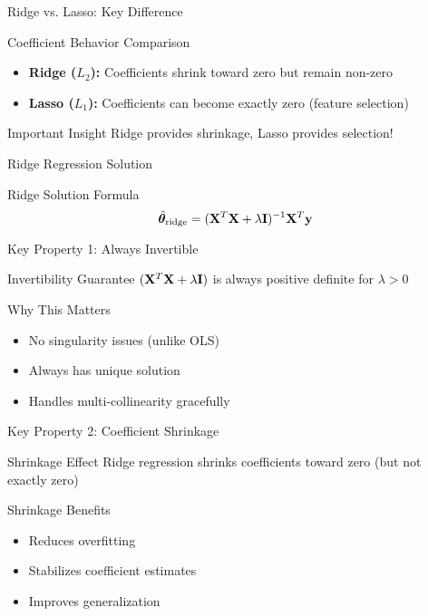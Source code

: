 \documentclass{beamer}
\begin{document}
\begin{frame}{Ridge vs. Lasso: Key Difference}
\begin{keypointsbox}{Coefficient Behavior Comparison}
\begin{itemize}
\item \textbf{Ridge ($L_2$):} Coefficients shrink toward zero but remain non-zero
\item \textbf{Lasso ($L_1$):} Coefficients can become exactly zero (feature selection)
\end{itemize}
\end{keypointsbox}
\pause

\begin{alertbox}{Important Insight}
Ridge provides shrinkage, Lasso provides selection!
\end{alertbox}
\end{frame}

\begin{frame}{Ridge Regression Solution}
\begin{theorembox}{Ridge Solution Formula}
$$\hat{\boldsymbol{\theta}}_{\text{ridge}} = (\mathbf{X}^T\mathbf{X} + \lambda\mathbf{I})^{-1}\mathbf{X}^T\mathbf{y}$$
\end{theorembox}
\end{frame}

\begin{frame}{Key Property 1: Always Invertible}
\begin{theorembox}{Invertibility Guarantee}
$(\mathbf{X}^T\mathbf{X} + \lambda\mathbf{I})$ is always positive definite for $\lambda > 0$
\end{theorembox}
\pause

\begin{keypointsbox}{Why This Matters}
\begin{itemize}
\item No singularity issues (unlike OLS)
\item Always has unique solution
\item Handles multi-collinearity gracefully
\end{itemize}
\end{keypointsbox}
\end{frame}

\begin{frame}{Key Property 2: Coefficient Shrinkage}
\begin{theorembox}{Shrinkage Effect}
Ridge regression shrinks coefficients toward zero (but not exactly zero)
\end{theorembox}
\pause

\begin{keypointsbox}{Shrinkage Benefits}
\begin{itemize}
\item Reduces overfitting
\item Stabilizes coefficient estimates
\item Improves generalization
\end{itemize}
\end{keypointsbox}
\end{frame}
\end{document}
